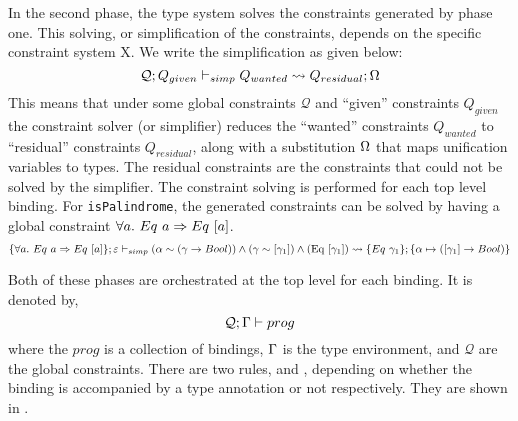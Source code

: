 \documentclass[manuscript,screen,nonacm]{acmart}
\begin{document}
\newcommand\SolConstraints[5]{\ensuremath{#1 ; #2 \vdash_{simp} #3 \rightsquigarrow #4 ; #5}}
In the second phase, the type system solves the constraints generated by phase one. This solving, or simplification of the constraints, depends on the specific constraint system X. We write the simplification as given below:
$$
\SolConstraints {\mathcal Q} {Q_{given}} {Q_{wanted}} {Q_{residual}} \Subst
$$
This means that under some global constraints $\mathcal{Q}$ and ``given'' constraints $Q_{given}$ the constraint solver (or simplifier) reduces the ``wanted'' constraints $Q_{wanted}$ to ``residual'' constraints $Q_{residual}$, along with a substitution $\Omega$ that maps unification variables to types. The residual constraints are the constraints that could not be solved by the simplifier. The constraint solving is performed for each top level binding. For \lstinline{isPalindrome}, the generated constraints can be solved
by having a global constraint $\forall a.~ Eq~ a \Rightarrow Eq~ [a]$.
$$
\SolConstraints {\Set{\forall a.~ Eq~ a \then Eq~ [a]}} {\varepsilon} {(\alpha \sim (\Co \to Bool)) \land (\Co \sim [\Co_1]) \land (\text{\lstinline{Eq}}~ [\Co_1])} {\Set{Eq~\Co_1}} {\Set{\alpha \mapsto ([\Co_1] \to Bool)}}
$$

\newcommand\TopLevel[3]{\ensuremath{#1 ; #2 \vdash #3}}
Both of these phases are orchestrated at the top level for each binding. It is denoted by,
$$
\TopLevel {\mathcal{Q}} \TEnv {prog}
$$
where the $prog$ is a collection of bindings, $\Gamma$ is the type environment, and $\mathcal Q$ are the global constraints. There are two rules,  and , depending on whether the binding is accompanied by a type annotation or not respectively. They are shown in .
\end{document}
